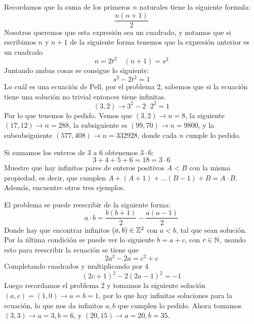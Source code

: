 \begin{sol}
	Recordamos que la suma de los primeros $n$ naturales tiene la siguiente formula:
	\[
		\frac{n(n+1)}2
	\]
	Nosotros queremos que esta expresión sea un cuadrado, y notamos que si escribimos $n$ y $n+1$ de la siguiente forma tenemos que la expresión anterior es un cuadrado
	\[
		n=2t^2\quad(n+1)=s^2
	\]
	Juntando ambas cosas se consigue lo siguiente:
	\[
		s^2-2t^2=1
	\]
	Lo cuál es una ecuación de Pell, por el problema 2, sabemos que si la ecuación tiene una solución no trivial entonces tiene infinitas.
	\[
		(3,2)\rightarrow 3^2-2\cdot2^2=1
	\]
	Por lo que tenemos lo pedido. Vemos que $(3,2)\rightarrow n=8$, la siguiente $(17,12)\rightarrow n=288$, la subsiguiente es $(99,70)\rightarrow n=9800$, y la subsubsiguiente $(577,408)\rightarrow n=332928$, donde cada $n$ cumple lo pedido.
\end{sol}

\begin{prob}[3 pts]
	Si sumamos los enteros de $3$ a $6$ obtenemos $3\cdot 6$:
	\[3+4+5+6=18=3\cdot 6\]
	Muestre que hay infinitos pares de enteros positivos $A<B$ con la misma propiedad, es decir, que cumplen $A+(A+1)+...(B-1)+B=A\cdot B$. Además, encuentre otros tres ejemplos.
\end{prob}

\begin{sol}
	El problema se puede reescribir de la siguiente forma:
	\[
		a\cdot b=\frac{b(b+1)}2-\frac{a(a-1)}2
	\]
	Donde hay que encontrar infinitos $(a,b)\in\mathbb{Z}^2$ con $a<b$, tal que sean solución. Por la última condición se puede ver lo siguiente $b=a+c$, con $c\in\mathbb{N}$, usando esto para reescribir la ecuación se tiene que
	\[
		2a^2-2a=c^2+c
	\]
	Completando cuadrados y multiplicando por $4$
	\[
		(2c+1)^2-2(2a-1)^2=-1
	\]
	Luego recordamos el problema 2 y tomamos la siguiente solución $(a,c)=(1,0)\rightarrow a=b=1$, por lo que hay infinitas soluciones para la ecuación, lo que nos da infinitos $a,b$ que cumplen lo pedido. Ahora tomamos $(3,3)\rightarrow a=3, b=6$, y $(20,15)\rightarrow a=20, b=35$.
\end{sol}




